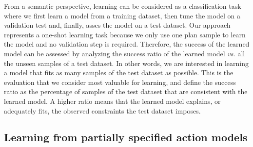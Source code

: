 \documentclass{ecai}
\begin{document}
From a semantic perspective, learning can be considered as a classification task where we first learn a model from a training dataset, then tune the model on a validation test and, finally, asses the model on a test dataset. Our approach represents a one-shot learning task because we only use one plan sample to learn the model and no validation step is required.
Therefore, the success of the learned model can be assessed by analyzing the success ratio of the learned model \emph{vs.} all the unseen samples of a test dataset. In other words, we are interested in learning a model that fits as many samples of the test dataset as possible. This is the evaluation that we consider most valuable for learning, and define the success ratio as the percentage of samples of the test dataset that are consistent with the learned model. A higher ratio means that the learned model explains, or adequately fits, the observed constraints the test dataset imposes.


\subsection{Learning from partially specified action models}
\end{document}
